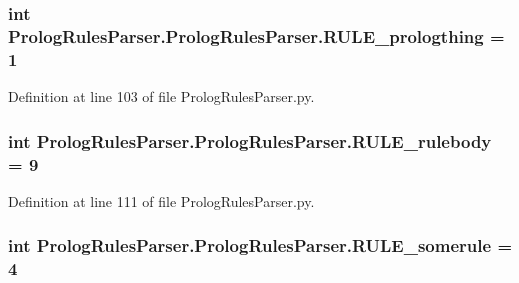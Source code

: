 \subsubsection[{R\+U\+L\+E\+\_\+prologthing}]{\setlength{\rightskip}{0pt plus 5cm}int Prolog\+Rules\+Parser.\+Prolog\+Rules\+Parser.\+R\+U\+L\+E\+\_\+prologthing = 1\hspace{0.3cm}{\ttfamily [static]}}\label{class_prolog_rules_parser_1_1_prolog_rules_parser_a20f16c36ca3e1f291e4777f1c7ed094d}


Definition at line 103 of file Prolog\+Rules\+Parser.\+py.

\hypertarget{class_prolog_rules_parser_1_1_prolog_rules_parser_acd27c1d066aeef36840d89aaaaa79795}{}
\subsubsection[{R\+U\+L\+E\+\_\+rulebody}]{\setlength{\rightskip}{0pt plus 5cm}int Prolog\+Rules\+Parser.\+Prolog\+Rules\+Parser.\+R\+U\+L\+E\+\_\+rulebody = 9\hspace{0.3cm}{\ttfamily [static]}}\label{class_prolog_rules_parser_1_1_prolog_rules_parser_acd27c1d066aeef36840d89aaaaa79795}


Definition at line 111 of file Prolog\+Rules\+Parser.\+py.

\hypertarget{class_prolog_rules_parser_1_1_prolog_rules_parser_af40e6329c30ba757f2a1251eb60fd3f3}{}
\subsubsection[{R\+U\+L\+E\+\_\+somerule}]{\setlength{\rightskip}{0pt plus 5cm}int Prolog\+Rules\+Parser.\+Prolog\+Rules\+Parser.\+R\+U\+L\+E\+\_\+somerule = 4\hspace{0.3cm}{\ttfamily [static]}}\label{class_prolog_rules_parser_1_1_prolog_rules_parser_af40e6329c30ba757f2a1251eb60fd3f3}


